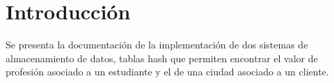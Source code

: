 \vspace*{\fill}

\section{Introducción}

  Se presenta la documentación de la implementación de dos sistemas de almacenamiento de datos, tablas hash que permiten encontrar el valor de profesión asociado a un estudiante y el de una ciudad asociado a un cliente.

\vspace*{\fill}